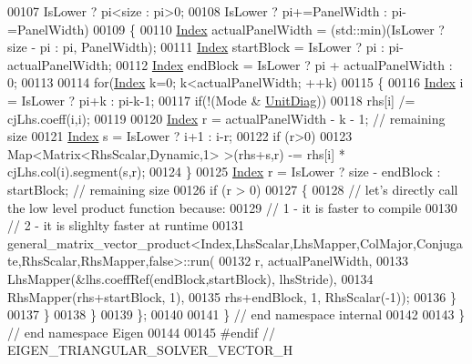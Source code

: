 \begin{DoxyCode}
00107         IsLower ? pi<size : pi>0;
00108         IsLower ? pi+=PanelWidth : pi-=PanelWidth)
00109     \{
00110       \hyperlink{namespace_eigen_a62e77e0933482dafde8fe197d9a2cfde}{Index} actualPanelWidth = (std::min)(IsLower ? size - pi : pi, PanelWidth);
00111       \hyperlink{namespace_eigen_a62e77e0933482dafde8fe197d9a2cfde}{Index} startBlock = IsLower ? pi : pi-actualPanelWidth;
00112       \hyperlink{namespace_eigen_a62e77e0933482dafde8fe197d9a2cfde}{Index} endBlock = IsLower ? pi + actualPanelWidth : 0;
00113 
00114       \textcolor{keywordflow}{for}(\hyperlink{namespace_eigen_a62e77e0933482dafde8fe197d9a2cfde}{Index} k=0; k<actualPanelWidth; ++k)
00115       \{
00116         \hyperlink{namespace_eigen_a62e77e0933482dafde8fe197d9a2cfde}{Index} i = IsLower ? pi+k : pi-k-1;
00117         \textcolor{keywordflow}{if}(!(Mode & \hyperlink{group__enums_gga39e3366ff5554d731e7dc8bb642f83cdaddb72f888ac85d5a1c52333e54f9374b}{UnitDiag}))
00118           rhs[i] /= cjLhs.coeff(i,i);
00119 
00120         \hyperlink{namespace_eigen_a62e77e0933482dafde8fe197d9a2cfde}{Index} r = actualPanelWidth - k - 1; \textcolor{comment}{// remaining size}
00121         \hyperlink{namespace_eigen_a62e77e0933482dafde8fe197d9a2cfde}{Index} s = IsLower ? i+1 : i-r;
00122         \textcolor{keywordflow}{if} (r>0)
00123           Map<Matrix<RhsScalar,Dynamic,1> >(rhs+s,r) -= rhs[i] * cjLhs.col(i).segment(s,r);
00124       \}
00125       \hyperlink{namespace_eigen_a62e77e0933482dafde8fe197d9a2cfde}{Index} r = IsLower ? size - endBlock : startBlock; \textcolor{comment}{// remaining size}
00126       \textcolor{keywordflow}{if} (r > 0)
00127       \{
00128         \textcolor{comment}{// let's directly call the low level product function because:}
00129         \textcolor{comment}{// 1 - it is faster to compile}
00130         \textcolor{comment}{// 2 - it is slighlty faster at runtime}
00131         
      general\_matrix\_vector\_product<Index,LhsScalar,LhsMapper,ColMajor,Conjugate,RhsScalar,RhsMapper,false>::run(
00132             r, actualPanelWidth,
00133             LhsMapper(&lhs.coeffRef(endBlock,startBlock), lhsStride),
00134             RhsMapper(rhs+startBlock, 1),
00135             rhs+endBlock, 1, RhsScalar(-1));
00136       \}
00137     \}
00138   \}
00139 \};
00140 
00141 \} \textcolor{comment}{// end namespace internal}
00142 
00143 \} \textcolor{comment}{// end namespace Eigen}
00144 
00145 \textcolor{preprocessor}{#endif // EIGEN\_TRIANGULAR\_SOLVER\_VECTOR\_H}
\end{DoxyCode}

